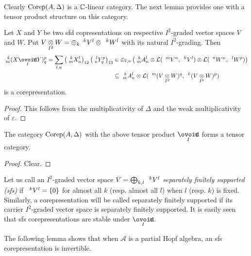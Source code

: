 Clearly $\Corep(A,\Delta)$ is a $\C$-linear category. The next lemma provides one with a tensor product structure on this category.

\begin{Lem} Let $X$ and $Y$ be two sfd copresentations on respective $I^2$-graded vector spaces $V$ and $W$. Put $V\itimes W = \oplus_k \Gru{V}{k}{l} \otimes \Gru{W}{k}{l}$ with its natural $I^2$-grading. Then \begin{eqnarray*} \Gr{(X\Circt Y)}{k}{p}{m}{q} = \sum_{l,n} \left(\Gr{X}{k}{l}{m}{n}\right)_{12}\left(\Gr{Y}{l}{p}{n}{q}\right)_{13} &\in \oplus_{l,n} \left( \Gr{A}{k}{l}{m}{n}\otimes \mathcal{L}(\Gru{V}{m}{n},\Gru{V}{k}{l})\otimes \mathcal{L}(\Gru{W}{n}{w},\Gru{W}{l}{p})\right) \\& \subseteq  \Gr{A}{k}{l}{m}{n}\otimes \mathcal{L}(\Gru{(V\itimes W)}{m}{q},\Gru{(V\itimes W)}{k}{p})\end{eqnarray*} is a corepresentation.
\end{Lem} 

\begin{proof} This follows from the multiplicativity of $\Delta$ and the weak multiplicativity of $\varepsilon$. %
\end{proof} 

\begin{Cor} The category $\Corep(A,\Delta)$ with the above tensor product $\Circt$ forms a tensor category.
\end{Cor}
\begin{proof} Clear.
\end{proof} 

Let us call an $I^2$-graded vector space $V=\bigoplus_{k,l} \Gru{V}{k}{l}$ \emph{separately finitely supported (sfs)} %
if $\Gru{V}{k}{l} = \{0\}$ for almost all $k$ (resp. almost all $l$) when $l$ (resp. $k$) is fixed. Similarly, a corepresentation will be called separately finitely supported if its carrier $I^2$-graded vector space is separately finitely supported. It is easily seen that sfs corepresentations are stable under $\Circt$. 


The following lemma shows that when $\mathscr{A}$ is a partial Hopf algebra, an sfs corepresentation is invertible.

